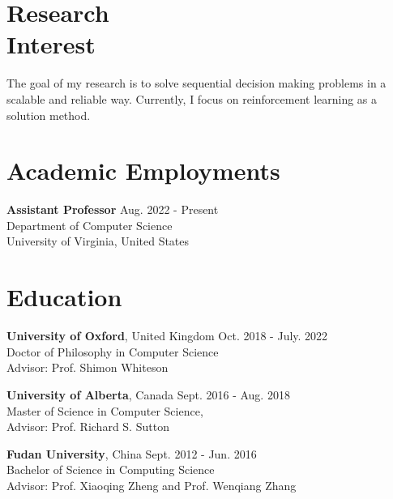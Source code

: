 \documentclass[margin, 10pt]{res} %
\begin{document}
\begin{resume}

 
\section{Research \\ Interest}  
The goal of my research is to solve sequential decision making problems in a scalable and reliable way.
Currently, I focus on reinforcement learning as a solution method.


\section{Academic Employments}
{\textbf{Assistant Professor}} \hfill Aug. 2022 - Present \\
Department of Computer Science \\
University of Virginia, United States

\section{Education}

{\textbf{University of Oxford}, United Kingdom}  \hfill Oct. 2018 - July. 2022 \\
Doctor of Philosophy in Computer Science \\
Advisor: Prof. Shimon Whiteson

{\textbf{University of Alberta}, Canada}  \hfill Sept. 2016 - Aug. 2018 \\
Master of Science in Computer Science,  \\
Advisor: Prof. Richard S. Sutton

{\textbf{Fudan University}, China}  \hfill Sept. 2012 - Jun. 2016 \\
Bachelor of Science in Computing Science \\
Advisor: Prof. Xiaoqing Zheng and Prof. Wenqiang Zhang



\end{resume}
\end{document}
